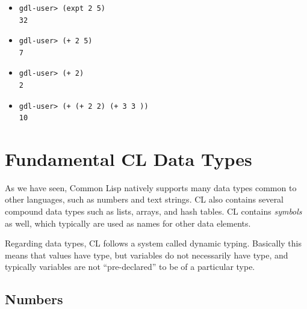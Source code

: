\documentclass [11pt]{book}
\begin{document}
\begin{itemize}
\begin{itemize}

\item 

\begin{verbatim}gdl-user> (expt 2 5)
32
\end{verbatim}

\item 

\begin{verbatim}gdl-user> (+ 2 5)
7
\end{verbatim}

\item 

\begin{verbatim}gdl-user> (+ 2)
2
\end{verbatim}

\item 

\begin{verbatim}gdl-user> (+ (+ 2 2) (+ 3 3 ))
10
\end{verbatim}

\end{itemize}



\end{itemize}





\section{Fundamental CL Data Types}

\label{sec:fundamentalcldatatypes}



As we have seen, Common Lisp natively supports
many data types common to other languages, such as numbers and text
strings. CL also contains several compound data types such as lists,
arrays, and hash tables. CL contains \emph{symbols} as well, which typically are used as names for other data elements.



Regarding data types, CL follows a system called dynamic
typing. Basically this means that values have type, but variables do
not necessarily have type, and typically variables are not
``pre-declared'' to be of a particular type.



\subsection{Numbers}
\end{document}
